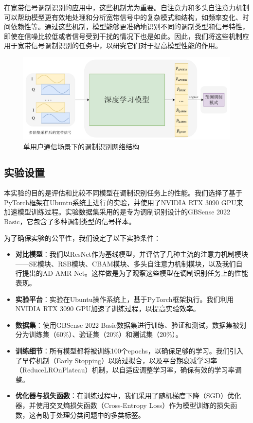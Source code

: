 在宽带信号调制识别的应用中，这些机制尤为重要。自注意力和多头自注意力机制可以帮助模型更有效地处理和分析宽带信号中的复杂模式和结构，如频率变化、时间依赖性等。通过这些机制，模型能够更准确地识别不同的调制类型和信号特性，即使在信噪比较低或者信号受到干扰的情况下也是如此。因此，我们将这些机制应用于宽带信号调制识别的任务中，以研究它们对于提高模型性能的作用。


\begin{figure}
    \centering
    \includegraphics[width=\textwidth]{Image/adamr-wideband.pdf}
    \caption{单用户通信场景下的调制识别网络结构}
    \label{fig:basic}
\end{figure}

\subsection{实验设置}\label{sec:background}

本实验的目的是评估和比较不同模型在调制识别任务上的性能。我们选择了基于PyTorch框架在Ubuntu系统上进行的实验，并使用了NVIDIA RTX 3090 GPU来加速模型训练过程。实验数据集采用的是专为调制识别设计的GBSense 2022 Basic，它包含了多种调制类型的信号样本。

为了确保实验的公平性，我们设定了以下实验条件：

\begin{itemize}
    \item \textbf{对比模型}：我们以ResNet作为基线模型，并评估了几种主流的注意力机制模块——SE模块、RSB模块、CBAM模块、多头自注意力机制模块，以及我们自行提出的AD-AMR Net。这样做是为了观察这些模型在调制识别任务上的性能表现。
    \item \textbf{实验平台}：实验在Ubuntu操作系统上，基于PyTorch框架执行。我们利用NVIDIA RTX 3090 GPU加速了训练过程，以提高实验效率。
    \item \textbf{数据集}：使用GBSense 2022 Basic数据集进行训练、验证和测试，数据集被划分为训练集（60\%）、验证集（20\%）和测试集（20\%）。
    \item \textbf{训练细节}：所有模型都将被训练100个epochs，以确保足够的学习。我们引入了早停机制（Early Stopping）以防过拟合，以及平台期衰减学习率（ReduceLROnPlateau）机制，以自适应调整学习率，确保有效的学习率调整。
    \item \textbf{优化器与损失函数}：在训练过程中，我们采用了随机梯度下降（SGD）优化器，并使用交叉熵损失函数（Cross-Entropy Loss）作为模型训练的损失函数，这有助于处理分类问题中的多类标签。
\end{itemize}

